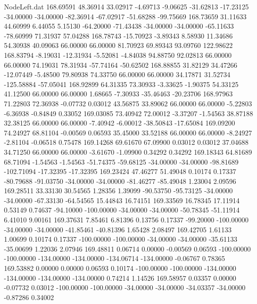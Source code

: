 \begin{filecontents}{NodeLeft.dat}
 168.69591   48.36914   33.02917    -4.69713   -9.06625  -31.62813  -17.23125  -34.00000  -34.00000  -82.36914  -67.02917  -51.68288  -99.75669
 168.73659   31.11633   44.60999     6.44055    5.15130  -64.20000  -71.43438  -34.00000  -34.00000  -65.11633  -78.60999   71.31937   57.04288
 168.78743  -15.70923   -3.89343     8.58930   11.34686   54.30938   40.09063   66.00000   66.00000   81.70923   69.89343   93.09760  122.98622
 168.83794   -8.19031  -12.31934    -5.52081   -4.84038   94.88750   92.02813   66.00000   66.00000   74.19031   78.31934  -57.74164  -50.62502
 168.88855   31.82129   34.47266   -12.07449   -5.48500   79.80938   74.33750   66.00000   66.00000   34.17871   31.52734 -125.58884  -57.05041
 168.92899   64.31335   73.30933    -3.33625   -1.90375   54.33125   41.12500   66.00000   66.00000    1.68665   -7.30933  -35.46463  -20.23706
 168.97963   71.22803   72.36938    -0.07732    0.03012   43.56875   33.89062   66.00000   66.00000   -5.22803   -6.36938   -0.84849    0.33052
 169.03085   73.40942   72.00012    -3.37207   -1.54563   38.87188   32.38125   66.00000   66.00000   -7.40942   -6.00012  -38.50843  -17.65084
 169.09200   74.24927   68.81104    -0.00569    0.06593   35.45000   33.52188   66.00000   66.00000   -8.24927   -2.81104   -0.06518    0.75478
 169.14268   69.61670   67.09900     0.03012    0.03012   37.04688   34.71250   66.00000   66.00000   -3.61670   -1.09900    0.34292    0.34292
 169.18343   64.81689   68.71094    -1.54563   -1.54563  -51.74375  -59.68125  -34.00000  -34.00000  -98.81689 -102.71094  -17.32395  -17.32395
 169.23424   47.46277   51.49048     0.10174    0.17337  -80.79688  -91.03750  -34.00000  -34.00000  -81.46277  -85.49048    1.23004    2.09596
 169.28511   33.33130   30.54565     1.28356    1.39099  -90.53750  -95.73125  -34.00000  -34.00000  -67.33130  -64.54565   15.44843   16.74151
 169.33569   16.78345   17.11914     0.53149    0.74637  -94.10000 -100.00000  -34.00000  -34.00000  -50.78345  -51.11914    6.41010    9.00161
 169.37631    7.85461    6.81396     0.13756    0.17337  -99.20000 -100.00000  -34.00000  -34.00000  -41.85461  -40.81396    1.65428    2.08497
 169.42705    1.61133    1.00699     0.10174    0.17337 -100.00000 -100.00000  -34.00000  -34.00000  -35.61133  -35.00699    1.22036    2.07946
 169.48811    0.06714    0.00000    -0.00569    0.06593 -100.00000 -100.00000 -134.00000 -134.00000 -134.06714 -134.00000   -0.06767    0.78365
 169.53882    0.00000    0.00000     0.06593    0.10174 -100.00000 -100.00000 -134.00000 -134.00000 -134.00000 -134.00000    0.74214    1.14526
 169.58957    0.03357    0.00000    -0.07732    0.03012 -100.00000 -100.00000  -34.00000  -34.00000  -34.03357  -34.00000   -0.87286    0.34002

\end{filecontents}
